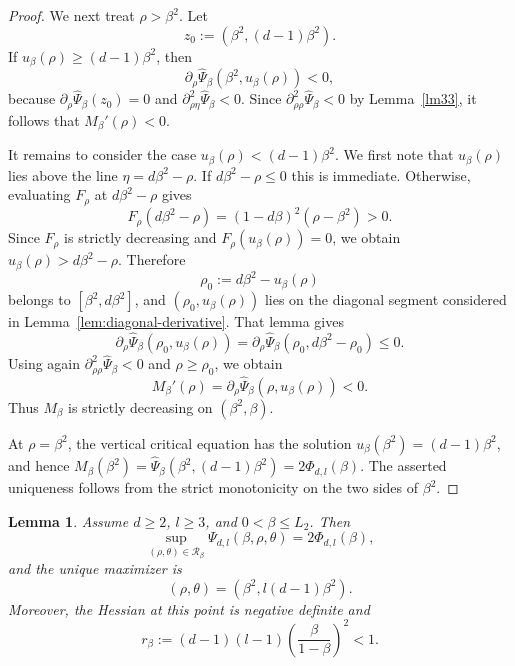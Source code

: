 \documentclass[11pt]{amsart}
\theoremstyle{plain}
\newtheorem{lemma}[theorem]{Lemma}
\numberwithin{equation}{section}
\numberwithin{theorem}{section}
\numberwithin{figure}{section}
\begin{document}
\begin{proof}
We next treat \(\rho>\beta^2\).  Let
\[
  z_0:=(\beta^2,(d-1)\beta^2).
\]
If \(u_\beta(\rho)\ge(d-1)\beta^2\), then
\[
  \partial_\rho\widehat\Psi_\beta(\beta^2,u_\beta(\rho))<0,
\]
because \(\partial_\rho\widehat\Psi_\beta(z_0)=0\) and
\(\partial_{\rho\eta}^2\widehat\Psi_\beta<0\).  Since
\(\partial_{\rho\rho}^2\widehat\Psi_\beta<0\) by Lemma~\ref{lm33}, it follows that
\(M_\beta'(\rho)<0\).

It remains to consider the case \(u_\beta(\rho)<(d-1)\beta^2\).  We first note that
\(u_\beta(\rho)\) lies above the line \(\eta=d\beta^2-\rho\).  If
\(d\beta^2-\rho\le0\) this is immediate.  Otherwise, evaluating \(F_\rho\) at
\(d\beta^2-\rho\) gives
\[
  F_\rho(d\beta^2-\rho)=(1-d\beta)^2(\rho-\beta^2)>0.
\]
Since \(F_\rho\) is strictly decreasing and \(F_\rho(u_\beta(\rho))=0\), we obtain
\(u_\beta(\rho)>d\beta^2-\rho\).  Therefore
\[
  \rho_0:=d\beta^2-u_\beta(\rho)
\]
belongs to \([\beta^2,d\beta^2]\), and
\((\rho_0,u_\beta(\rho))\) lies on the diagonal segment considered in
Lemma~\ref{lem:diagonal-derivative}.  That lemma gives
\[
  \partial_\rho\widehat\Psi_\beta(\rho_0,u_\beta(\rho))
  =\partial_\rho\widehat\Psi_\beta(\rho_0,d\beta^2-\rho_0)\le0.
\]
Using again \(\partial_{\rho\rho}^2\widehat\Psi_\beta<0\) and
\(\rho\ge\rho_0\), we obtain
\[
  M_\beta'(\rho)=\partial_\rho\widehat\Psi_\beta(\rho,u_\beta(\rho))<0.
\]
Thus \(M_\beta\) is strictly decreasing on \((\beta^2,\beta)\).

At \(\rho=\beta^2\), the vertical critical equation has the solution
\(u_\beta(\beta^2)=(d-1)\beta^2\), and hence
\(M_\beta(\beta^2)=\widehat\Psi_\beta(\beta^2,(d-1)\beta^2)=2\Phi_{d,l}(\beta)\).
The asserted uniqueness follows from the strict monotonicity on the two sides of
\(\beta^2\).
\end{proof}

\begin{lemma}\label{lem:L2-global-maximum}
Assume \(d\ge2\), \(l\ge3\), and \(0<\beta\le L_2\).  Then
\begin{equation}\label{eq:L2-global-max}
  \sup_{(\rho,\theta)\in\mathcal R_\beta}
  \Psi_{d,l}(\beta,\rho,\theta)=2\Phi_{d,l}(\beta),
\end{equation}
and the unique maximizer is
\[
  (\rho,\theta)=(\beta^2,l(d-1)\beta^2).
\]
Moreover, the Hessian at this point is negative definite and
\begin{equation}\label{eq:L2-r-less-one}
  r_\beta:=(d-1)(l-1)\left(\frac{\beta}{1-\beta}\right)^2<1.
\end{equation}
\end{lemma}
\end{document}
